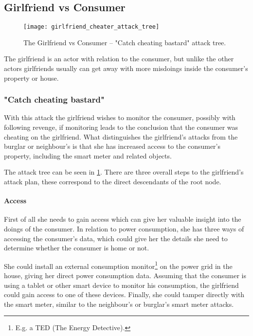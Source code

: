 \subsection{Girlfriend vs Consumer}

\begin{figure}
	\texttt{[image: girlfriend\_cheater\_attack\_tree]}
	\caption{The Girlfriend vs Consumer -- "Catch cheating bastard" attack tree.}
	\label{fig:attack_trees:girlfriend:cheater}
\end{figure}

The girlfriend is an actor with relation to the consumer, but unlike the other actors girlfriends usually can get away with more misdoings inside the consumer's property or house.

\subsubsection{"Catch cheating bastard"}

With this attack the girlfriend wishes to monitor the consumer, possibly with following revenge, if monitoring leads to the conclusion that the consumer was cheating on the girlfriend.
What distinguishes the girlfriend's attacks from the burglar or neighbour's is that she has increased access to the consumer's property, including the smart meter and related objects.

The attack tree can be seen in \cref{fig:attack_trees:girlfriend:cheater}.
There are three overall steps to the girlfriend's attack plan, these correspond to the direct descendants of the root node.

\paragraph{Access}
First of all she needs to gain access which can give her valuable insight into the doings of the consumer.
In relation to power consumption, she has three ways of accessing the consumer's data, which could give her the details she need to determine whether the consumer is home or not.

She could install an external consumption monitor\footnote{E.g. a TED (The Energy Detective).} on the power grid in the house, giving her direct power consumption data.
Assuming that the consumer is using a tablet or other smart device to monitor his consumption, the girlfriend could gain access to one of these devices.
Finally, she could tamper directly with the smart meter, similar to the neighbour's or burglar's smart meter attacks.

